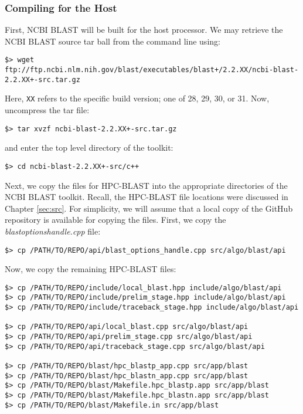 \documentclass[10pt]{article}
\begin{document}
\subsubsection{Compiling for the Host} \label{sssec:ncbi-host}
First, NCBI BLAST will be built for the host processor.  We may retrieve the NCBI BLAST source tar ball from the command line using:
\begin{verbatim}
$> wget ftp://ftp.ncbi.nlm.nih.gov/blast/executables/blast+/2.2.XX/ncbi-blast-2.2.XX+-src.tar.gz
\end{verbatim}
\noindent Here, \verb^XX^ refers to the specific build version; one of 28, 29, 30, or 31.  Now, uncompress the tar file:
\begin{verbatim}
$> tar xvzf ncbi-blast-2.2.XX+-src.tar.gz
\end{verbatim}
\noindent and enter the top level directory of the toolkit:
\begin{verbatim}
$> cd ncbi-blast-2.2.XX+-src/c++
\end{verbatim}
\noindent Next, we copy the files for HPC-BLAST into the appropriate directories of the NCBI BLAST toolkit.  Recall, the HPC-BLAST file locations were discussed in Chapter \ref{sec:src}.  For simplicity, we will assume that a local copy of the
GitHub repository is available for copying the files.  First, we copy the \emph{blast\textunderscore options\textunderscore handle.cpp} file:
\footnotesize
\begin{verbatim}
$> cp /PATH/TO/REPO/api/blast_options_handle.cpp src/algo/blast/api
\end{verbatim}
\normalsize
\noindent Now, we copy the remaining HPC-BLAST files:
\footnotesize
\begin{verbatim}
$> cp /PATH/TO/REPO/include/local_blast.hpp include/algo/blast/api
$> cp /PATH/TO/REPO/include/prelim_stage.hpp include/algo/blast/api
$> cp /PATH/TO/REPO/include/traceback_stage.hpp include/algo/blast/api

$> cp /PATH/TO/REPO/api/local_blast.cpp src/algo/blast/api
$> cp /PATH/TO/REPO/api/prelim_stage.cpp src/algo/blast/api
$> cp /PATH/TO/REPO/api/traceback_stage.cpp src/algo/blast/api

$> cp /PATH/TO/REPO/blast/hpc_blastp_app.cpp src/app/blast
$> cp /PATH/TO/REPO/blast/hpc_blastn_app.cpp src/app/blast
$> cp /PATH/TO/REPO/blast/Makefile.hpc_blastp.app src/app/blast
$> cp /PATH/TO/REPO/blast/Makefile.hpc_blastn.app src/app/blast
$> cp /PATH/TO/REPO/blast/Makefile.in src/app/blast
\end{verbatim}
\normalsize
\end{document}
